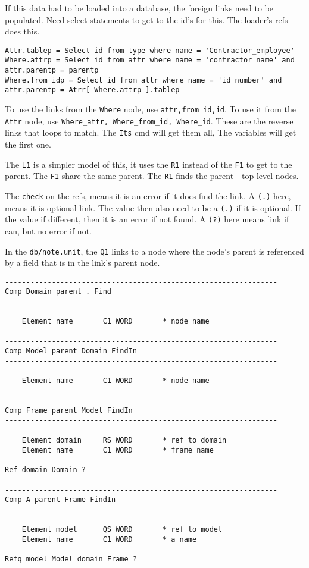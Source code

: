 \documentclass[11pt]{article}
\begin{document}
If this data had to be loaded into a database, the foreign links need to
be populated. Need select statements to get to the id's for this. The
loader's refs does this.

\begin{verbatim}
Attr.tablep = Select id from type where name = 'Contractor_employee'
Where.attrp = Select id from attr where name = 'contractor_name' and attr.parentp = parentp
Where.from_idp = Select id from attr where name = 'id_number' and attr.parentp = Atrr[ Where.attrp ].tablep
\end{verbatim}

To use the links from the \texttt{Where} node, use
\texttt{attr,from\_id,id}. To use it from the \texttt{Attr} node, use
\texttt{Where\_attr,\ Where\_from\_id,\ Where\_id}. These are the
reverse links that loops to match. The \texttt{Its} cmd will get them
all, The variables will get the first one.

The \texttt{L1} is a simpler model of this, it uses the \texttt{R1}
instead of the \texttt{F1} to get to the parent. The \texttt{F1} share
the same parent. The \texttt{R1} finds the parent - top level nodes.

The \texttt{check} on the refs, means it is an error if it does find the
link. A \texttt{(.)} here, means it is optional link. The value then
also need to be a \texttt{(.)} if it is optional. If the value if
different, then it is an error if not found. A \texttt{(?)} here means
link if can, but no error if not.

In the \texttt{db/note.unit}, the \texttt{Q1} links to a node where the
node's parent is referenced by a field that is in the link's parent
node.

\begin{verbatim}
----------------------------------------------------------------
Comp Domain parent . Find
----------------------------------------------------------------

    Element name       C1 WORD       * node name
    
----------------------------------------------------------------
Comp Model parent Domain FindIn
----------------------------------------------------------------

    Element name       C1 WORD       * node name

----------------------------------------------------------------
Comp Frame parent Model FindIn
----------------------------------------------------------------

    Element domain     RS WORD       * ref to domain
    Element name       C1 WORD       * frame name
    
Ref domain Domain ?

----------------------------------------------------------------
Comp A parent Frame FindIn
----------------------------------------------------------------

    Element model      QS WORD       * ref to model
    Element name       C1 WORD       * a name

Refq model Model domain Frame ?
\end{verbatim}
\end{document}
